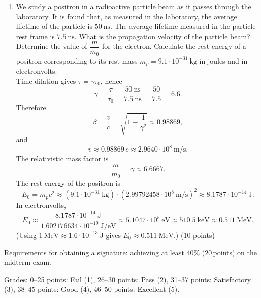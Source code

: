 \documentclass[12pt]{letter}
\begin{document}
\begin{enumerate}

\bigskip
\item We study a positron in a radioactive particle beam as it passes through the laboratory. It is found that, as measured in the laboratory, the average lifetime of the particle is $50\ \text{ns}$. The average lifetime measured in the particle rest frame is $7.5\ \text{ns}$. What is the propagation velocity of the particle beam? Determine the value of $\dfrac{m}{m_0}$ for the electron. Calculate the rest energy of a positron corresponding to its rest mass $m_p=9.1\cdot10^{-31}\ \text{kg}$ in joules and in electronvolts. \\

Time dilation gives $\tau=\gamma\tau_0$, hence
$$ \gamma=\frac{\tau}{\tau_0}=\frac{50\ \text{ns}}{7.5\ \text{ns}}=\frac{50}{7.5}=6.\overline{6}. $$
Therefore
$$ \beta=\frac{v}{c}=\sqrt{1-\frac{1}{\gamma^{2}}}\approx 0.98869, $$
and
$$ v\approx 0.98869\,c \approx 2.9640\cdot10^{8}\ \text{m/s}. $$
The relativistic mass factor is
$$\frac{m}{m_0}=\gamma\approx 6.6667. $$
The rest energy of the positron is
$$ E_{0}=m_p c^{2}\approx (9.1\cdot10^{-31}\ \text{kg})\cdot(2.99792458\cdot10^{8}\ \text{m/s})^{2} \approx 8.1787\cdot10^{-14}\ \text{J}. $$
In electronvolts,
$$ E_{0} \approx \frac{8.1787\cdot10^{-14}\ \text{J}}{1.602176634\cdot10^{-19}\ \text{J/eV}}
\approx 5.1047\cdot10^{5}\ \text{eV}\approx 510.5\ \text{keV}\approx 0.511\ \text{MeV}.$$
(Using $1\ \text{MeV}\approx 1.6\cdot10^{-13}\ \text{J}$ gives $E_0\approx 0.511\ \text{MeV}$.) \hfill (10 points)

\end{enumerate}


Requirements for obtaining a signature: achieving at least 40\% (20\,points) on the midterm exam.

Grades: 0–25 points: Fail (1), 26–30 points: Pass (2), 31–37 points: Satisfactory (3), 38–45 points: Good (4), 46–50 points: Excellent (5).

\end{document}
